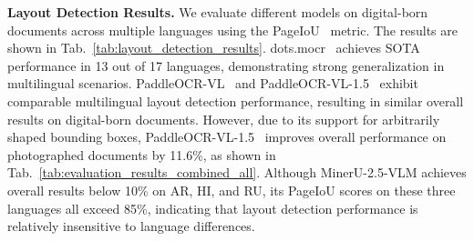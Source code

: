\documentclass[runningheads]{llncs}
\begin{document}
\noindent
\textbf{Layout Detection Results.} We evaluate different models on digital-born documents across multiple languages using the PageIoU~\cite{mineru2.5} metric. The results are shown in Tab.~\ref{tab:layout_detection_results}. dots.mocr~\cite{dotsmocr} achieves SOTA performance in 13 out of 17 languages, demonstrating strong generalization in multilingual scenarios. PaddleOCR-VL~\cite{paddleocr-vl} and PaddleOCR-VL-1.5~\cite{paddleocr-vl-1.5} exhibit comparable multilingual layout detection performance, resulting in similar overall results on digital-born documents. However, due to its support for arbitrarily shaped bounding boxes, PaddleOCR-VL-1.5~\cite{paddleocr-vl-1.5} improves overall performance on photographed documents by 11.6\%, as shown in Tab.~\ref{tab:evaluation_results_combined_all}.  Although MinerU-2.5-VLM achieves overall results below 10\% on AR, HI, and RU, its PageIoU scores on these three languages all exceed 85\%, indicating that layout detection performance is relatively insensitive to language differences.



\begin{table}[tbp]
\centering
\caption{Component-level layout detection evaluation on the MDPBench layout subset.}
\label{tab:layout_detection_results}
\end{table}
\end{document}

